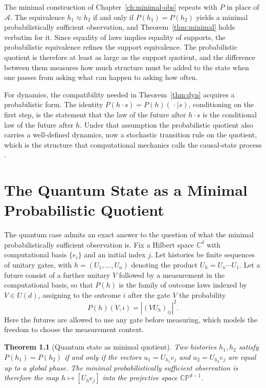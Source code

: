 \documentclass[11pt,oneside]{book}
\newtheorem{theorem}{Theorem}[chapter]
\theoremstyle{definition}
\theoremstyle{remark}
\newcommand{\Adm}{\mathcal{A}}
\begin{document}
The minimal construction of Chapter~\ref{ch:minimal-obs} repeats with $P$ in place of $\Adm$. The equivalence $h_1\approx h_2$ if and only if $P(h_1)=P(h_2)$ yields a minimal probabilistically sufficient observation, and Theorem~\ref{thm:minimal} holds verbatim for it. Since equality of laws implies equality of supports, the probabilistic equivalence refines the support equivalence. The probabilistic quotient is therefore at least as large as the support quotient, and the difference between them measures how much structure must be added to the state when one passes from asking what can happen to asking how often.

For dynamics, the compatibility needed in Theorem~\ref{thm:dyn} acquires a probabilistic form. The identity $P(h\cdot s)=P(h)(\,\cdot\mid s)$, conditioning on the first step, is the statement that the law of the future after $h\cdot s$ is the conditional law of the future after $h$. Under that assumption the probabilistic quotient also carries a well-defined dynamics, now a stochastic transition rule on the quotient, which is the structure that computational mechanics calls the causal-state process \cite{crutchfield1989,shalizi2001}.

\chapter{The Quantum State as a Minimal Probabilistic Quotient}\label{ch:state}

The quantum case admits an exact answer to the question of what the minimal probabilistically sufficient observation is. Fix a Hilbert space $\mathbb C^d$ with computational basis $\{e_i\}$ and an initial index $j$. Let histories be finite sequences of unitary gates, with $h=(U_1,\dots,U_n)$ denoting the product $U_h=U_n\cdots U_1$. Let a future consist of a further unitary $V$ followed by a measurement in the computational basis, so that $P(h)$ is the family of outcome laws indexed by $V\in U(d)$, assigning to the outcome $i$ after the gate $V$ the probability
\[
P(h)(V,i)=|(VU_h)_{ij}|^2 .
\]
Here the futures are allowed to use any gate before measuring, which models the freedom to choose the measurement context.

\begin{theorem}[Quantum state as minimal quotient]\label{thm:ray}
Two histories $h_1,h_2$ satisfy $P(h_1)=P(h_2)$ if and only if the vectors $u_1=U_{h_1}e_j$ and $u_2=U_{h_2}e_j$ are equal up to a global phase. The minimal probabilistically sufficient observation is therefore the map $h\mapsto[U_he_j]$ into the projective space $\mathbb{CP}^{d-1}$.
\end{theorem}
\end{document}
